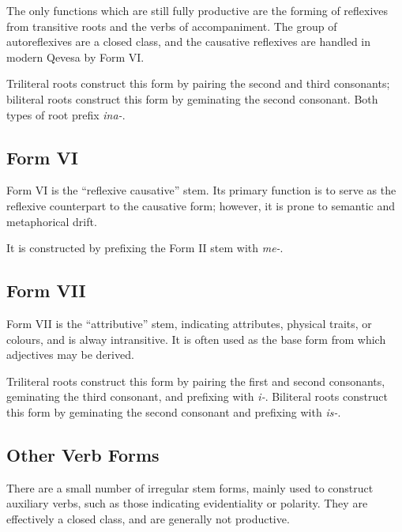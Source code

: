 \documentclass[grammar]{subfiles}
\begin{document}
	The only functions which are still fully productive are the forming of reflexives from transitive roots and the verbs of accompaniment. The group of autoreflexives are a closed class, and the causative reflexives are handled in modern Qevesa by Form VI.

	Triliteral roots construct this form by pairing the second and third consonants; biliteral roots construct this form by geminating the second consonant. Both types of root prefix \textit{ina-}.

	\subsection{Form VI}
	\label{ssec:dev_verb_form_vi}

	Form VI is the “reflexive causative” stem. Its primary function is to serve as the reflexive counterpart to the causative form; however, it is prone to semantic and metaphorical drift.
	
	It is constructed by prefixing the Form II stem with \textit{me-}. 
	
%

	\subsection{Form VII}
	\label{ssec:dev_verb_form_vii}

	Form VII is the “attributive” stem, indicating attributes, physical traits, or colours, and is alway intransitive. It is often used as the base form from which adjectives may be derived.
	
	Triliteral roots construct this form by pairing the first and second consonants, geminating the third consonant, and prefixing with \textit{i-}. Biliteral roots construct this form by geminating the second consonant and prefixing with \textit{is-}.

	\subsection{Other Verb Forms}
	\label{ssec:dev_other_verb_forms}

	There are a small number of irregular stem forms, mainly used to construct auxiliary verbs, such as those indicating evidentiality or polarity. They are effectively a closed class, and are generally not productive.
\end{document}
